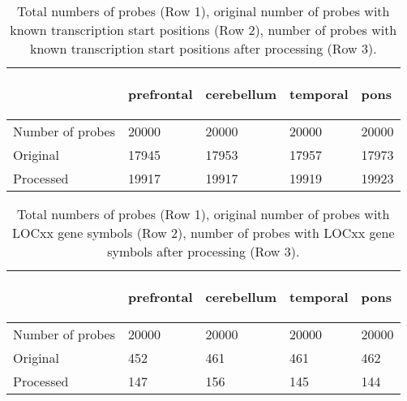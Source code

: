 \documentclass[11pt]{article}
\begin{document}
% 
\begin{table}[ht]
\centering
\caption{Total numbers of probes (Row 1), original number of probes with known transcription start positions (Row 2), number of probes with known transcription start positions after processing (Row 3).} 
\begin{tabularx}{\textwidth}{lXXXX}
  \hline
 & \begin{sideways} prefrontal \end{sideways} & \begin{sideways} cerebellum \end{sideways} & \begin{sideways} temporal \end{sideways} & \begin{sideways} pons \end{sideways} \\ 
  \hline
Number of probes & 20000 & 20000 & 20000 & 20000 \\ 
  Original & 17945 & 17953 & 17957 & 17973 \\ 
  Processed & 19917 & 19917 & 19919 & 19923 \\ 
   \hline
\end{tabularx}
\end{table}
% 
\begin{table}[ht]
\centering
\caption{Total numbers of probes (Row 1), original number of probes with LOCxx gene symbols (Row 2), number of probes with LOCxx gene symbols after processing (Row 3).} 
\begin{tabularx}{\textwidth}{lXXXX}
  \hline
 & \begin{sideways} prefrontal \end{sideways} & \begin{sideways} cerebellum \end{sideways} & \begin{sideways} temporal \end{sideways} & \begin{sideways} pons \end{sideways} \\ 
  \hline
Number of probes & 20000 & 20000 & 20000 & 20000 \\ 
  Original & 452 & 461 & 461 & 462 \\ 
  Processed & 147 & 156 & 145 & 144 \\ 
   \hline
\end{tabularx}
\end{table}
\end{document}
